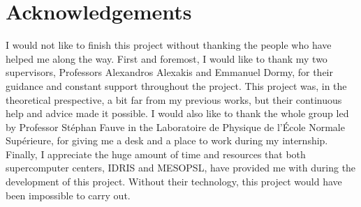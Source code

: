 \documentclass[../main.tex]{subfiles}
\begin{document}
\section*{Acknowledgements}
I would not like to finish this project without thanking the people who have helped me along the way. First and foremost, I would like to thank my two supervisors, Professors Alexandros Alexakis and Emmanuel Dormy, for their guidance and constant support throughout the project. This project was, in the theoretical prespective, a bit far from my previous works, but their continuous help and advice made it possible. I would also like to thank the whole group led by Professor Stéphan Fauve in the Laboratoire de Physique de l'École Normale Supérieure, for giving me a desk and a place to work during my internship. Finally, I appreciate the huge amount of time and resources that both supercomputer centers, IDRIS and MESOPSL, have provided me with during the development of this project. Without their technology, this project would have been impossible to carry out.
\end{document}
